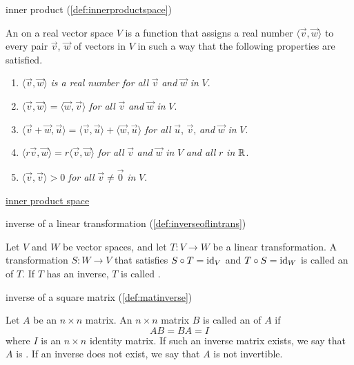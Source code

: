 \documentclass{ximera}
\begin{document}
inner product (\ref{def:innerproductspace})
\begin{expandable}
    An  on a real vector space $V$ is a function that assigns a real number $\langle\vec{v}, \vec{w}\rangle$ to every pair $\vec{v}$, $\vec{w}$ of vectors in $V$ in such a way that the following properties are satisfied.

\begin{enumerate}
\item\label{prop:inner_prod_1}  $\langle\vec{v}, \vec{w}\rangle$ \textit{is a real number for all} $\vec{v}$ \textit{and} $\vec{w}$ \textit{in} $V$.

\item\label{prop:inner_prod_2}  $\langle\vec{v}, \vec{w}\rangle = \langle\vec{w}, \vec{v}\rangle$ \textit{for all} $\vec{v}$ \textit{and} $\vec{w}$ \textit{in} $V$.

\item\label{prop:inner_prod_3}  $\langle\vec{v} + \vec{w}, \vec{u}\rangle = \langle\vec{v}, \vec{u}\rangle + \langle\vec{w}, \vec{u}\rangle$ \textit{for all} $\vec{u}$, $\vec{v}$, \textit{and} $\vec{w}$ \textit{in} $V$.

\item\label{prop:inner_prod_4} $\langle r\vec{v}, \vec{w}\rangle = r\langle\vec{v}, \vec{w}\rangle$ \textit{for all} $\vec{v}$ \textit{and} $\vec{w}$ \textit{in} $V$ \textit{and all} $r$ \textit{in} $\mathbb{R}$.

\item\label{prop:inner_prod_5}  $\langle\vec{v}, \vec{v}\rangle > 0$ \textit{for all} $\vec{v} \neq \vec{0}$ \textit{in} $V$.

\end{enumerate}
\end{expandable}

\href{https://ximera.osu.edu/oerlinalg/LinearAlgebra/VSP-0070/main}{inner product space}

inverse of a linear transformation (\ref{def:inverseoflintrans})
\begin{expandable}
    Let $V$ and $W$ be vector spaces, and let $T:V\rightarrow W$ be a linear transformation.  A transformation $S:W\rightarrow V$ that satisfies $S\circ T=\text{id}_V$ and $T\circ S=\text{id}_W$ is called an  of $T$. If $T$ has an inverse, $T$ is called .
\end{expandable}

inverse of a square matrix (\ref{def:matinverse})
\begin{expandable}
    Let $A$ be an $n\times n$ matrix.  An $n\times n$ matrix $B$ is called an  of $A$ if 
$$AB=BA=I$$
where $I$ is an $n\times n$ identity matrix.  If such an inverse matrix exists, we say that $A$ is .  If an inverse does not exist, we say that $A$ is not invertible.
\end{expandable}
\end{document}

